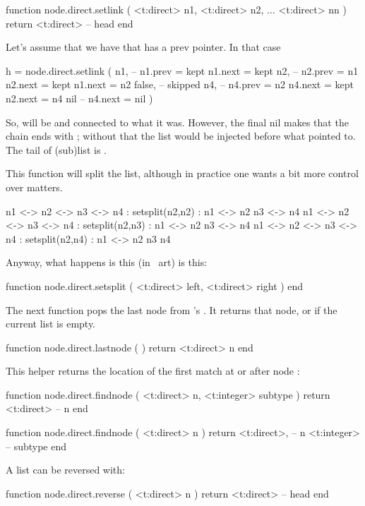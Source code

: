 \starttyping[option=LUA]
function node.direct.setlink (
    <t:direct> n1,
    <t:direct> n2,
    ...
    <t:direct> nn
)
    return <t:direct> -- head
end
\stoptyping

Let's assume that we have  that has a prev pointer. In that case

\starttyping[option=LUA]
h = node.direct.setlink (
    n1,    -- n1.prev = kept  n1.next = kept
    n2,    -- n2.prev = n1    n2.next = kept  n1.next = n2
    false, -- skipped
    n4,    -- n4.prev = n2    n4.next = kept  n2.next = n4
    nil    --                                 n4.next = nil
)
\stoptyping

So,  will be  and connected to what it was. However, the final
nil makes that the chain ends with ; without that the list would be
injected before what  pointed to. The tail of (sub)list  is
.

This function will split the list, although in practice one wants a bit more
control over matters.

\starttyping
n1 <-> n2 <-> n3 <-> n4 : setsplit(n2,n2) : n1 <-> n2      n3 <-> n4
n1 <-> n2 <-> n3 <-> n4 : setsplit(n2,n3) : n1 <-> n2      n3 <-> n4
n1 <-> n2 <-> n3 <-> n4 : setsplit(n2,n4) : n1 <-> n2  n3  n4
\stoptyping

Anyway, what happens is this (in \ASCII\ art) is this:

\starttyping[option=LUA]
function node.direct.setsplit ( <t:direct> left, <t:direct> right ) end
\stoptyping

The next function pops the last node from \TEX's . It returns
that node, or  if the current list is empty.

\starttyping[option=LUA]
function node.direct.lastnode ( )
    return <t:direct> n
end
\stoptyping

This helper returns the location of the first match at or after node :

\starttyping[option=LUA]
function node.direct.findnode ( <t:direct> n, <t:integer> subtype )
    return <t:direct> -- n
end

function node.direct.findnode ( <t:direct> n )
    return
        <t:direct>, -- n
        <t:integer> -- subtype
end
\stoptyping

A list can be reversed with:

\starttyping[option=LUA]
function node.direct.reverse ( <t:direct> n )
    return <t:direct> -- head
end
\stoptyping

